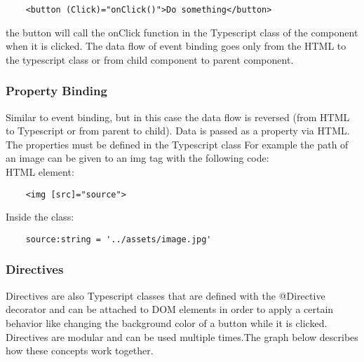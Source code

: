 \begin{verbatim}
	<button (Click)="onClick()">Do something</button>
\end{verbatim}

the button will call the onClick function in the Typescript class of the component when it is clicked. The data flow of event binding goes only from the HTML to the typescript class or from child component to parent component.

\subsubsection{Property Binding}
Similar to event binding, but in this case the data flow is reversed (from HTML to Typescript or from parent to child). Data is passed as a property via HTML. The properties must be defined in the Typescript class For example the path of an image can be given to an img tag with the following code:\\[0.5cm]
HTML element:
\begin{verbatim}
	<img [src]="source">
\end{verbatim}
Inside the class:
\begin{verbatim}
	source:string = '../assets/image.jpg'
\end{verbatim}

\subsubsection{Directives}
Directives are also Typescript classes that are defined with the @Directive decorator and can be attached to DOM elements in order to apply a certain behavior like changing the background color of a button while it is clicked. Directives are modular and can be used multiple times.The graph below describes how these concepts work together.


